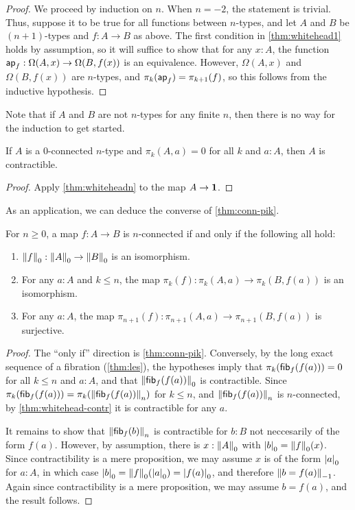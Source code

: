 \begin{proof}
  We proceed by induction on $n$.
  When $n=-2$, the statement is trivial.
  Thus, suppose it to be true for all functions between $n$-types, and let $A$ and $B$ be $(n+1)$-types and $f:A\to B$ as above.
  The first condition in \autoref{thm:whitehead1} holds by assumption, so it will suffice to show that for any $x:A$, the function $\apfunc f: \Omega(A,x) \to \Omega(B,f(x))$ is an equivalence.
  However, $\Omega(A,x)$ and $\Omega(B,f(x))$ are $n$-types, and $\pi_k(\apfunc f) = \pi_{k+1}(f)$, so this follows from the inductive hypothesis.
\end{proof}

Note that if $A$ and $B$ are not $n$-types for any finite $n$, then there is no way for the induction to get started.

\begin{cor}\label{thm:whitehead-contr}
  If $A$ is a $0$-connected $n$-type and $\pi_k(A,a)=0$ for all $k$ and $a:A$, then $A$ is contractible.
\end{cor}
\begin{proof}
  Apply \autoref{thm:whiteheadn} to the map $A\to\unit$.
\end{proof}

As an application, we can deduce the converse of \autoref{thm:conn-pik}.

\begin{cor}\label{thm:pik-conn}
  For $n\ge 0$, a map $f:A\to B$ is $n$-connected if and only if the following all hold:
  \begin{enumerate}
  \item $\trunc0f:\trunc0A \to \trunc0B$ is an isomorphism.
  \item For any $a:A$ and $k\le n$, the map $\pi_k(f):\pi_k(A,a) \to \pi_k(B,f(a))$ is an isomorphism.
  \item For any $a:A$, the map $\pi_{n+1}(f):\pi_{n+1}(A,a) \to \pi_{n+1}(B,f(a))$ is surjective.
  \end{enumerate}
\end{cor}
\begin{proof}
  The ``only if'' direction is \autoref{thm:conn-pik}.
  Conversely, by the long exact sequence of a fibration (\autoref{thm:les}),
  the hypotheses imply that $\pi_k(\hfib f {f(a)})=0$ for all $k\le n$ and $a:A$, and that $\trunc 0{\hfib f{f(a)}}$ is contractible.
  Since $\pi_k(\hfib f {f(a)}) = \pi_k(\trunc n{\hfib f{f(a)}})$ for $k\le n$, and $\trunc n{\hfib f{f(a)}}$ is $n$-connected, by \autoref{thm:whitehead-contr} it is contractible for any $a$.

  It remains to show that $\trunc n{\hfib f{b}}$ is contractible for $b:B$ not neccesarily of the form $f(a)$.
  However, by assumption, there is $x:\trunc0A$ with $\tproj 0b = \trunc0f(x)$.
  Since contractibility is a mere proposition, we may assume $x$ is of the form $\tproj0a$ for $a:A$, in which case $\tproj 0 b = \trunc0f(\tproj0a) = \tproj0{f(a)}$, and therefore $\trunc{-1}{b=f(a)}$.
  Again since contractibility is a mere proposition, we may assume $b=f(a)$, and the result follows.
\end{proof}

